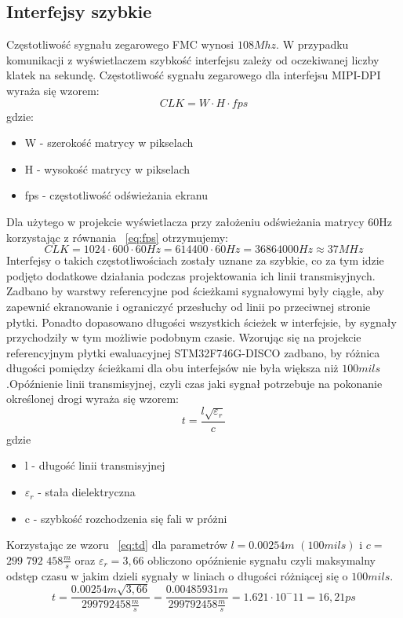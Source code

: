 \documentclass[eng,printmode]{mgr}
\begin{document}
\subsection{Interfejsy szybkie}
Częstotliwość sygnału zegarowego FMC wynosi $108Mhz$. W przypadku komunikacji z wyświetlaczem szybkość interfejsu zależy od oczekiwanej liczby klatek na sekundę. Częstotliwość sygnału zegarowego dla interfejsu MIPI-DPI wyraża się wzorem:
\begin{equation}
CLK = W \cdot H \cdot fps \label{eq:fps}
\end{equation}
gdzie:
\begin{itemize}
  \item W - szerokość matrycy w pikselach
  \item H - wysokość matrycy w pikselach
  \item fps - częstotliwość odświeżania ekranu
\end{itemize}
Dla użytego w projekcie wyświetlacza przy założeniu odświeżania matrycy 60Hz korzystając z równania ~\ref{eq:fps} otrzymujemy:
$$
CLK = 1024 \cdot 600 \cdot 60Hz = 614400 \cdot 60Hz = 36864000 Hz \approx 37MHz
$$
Interfejsy o takich częstotliwościach zostały uznane za szybkie, co za tym idzie podjęto dodatkowe działania podczas projektowania ich linii transmisyjnych. Zadbano by warstwy referencyjne pod ścieżkami sygnałowymi były ciągłe, aby zapewnić ekranowanie i ograniczyć przesłuchy od linii po przeciwnej stronie płytki. Ponadto dopasowano długości wszystkich ścieżek w interfejsie, by sygnały przychodziły w tym możliwie podobnym czasie. Wzorując się na projekcie referencyjnym płytki ewaluacyjnej STM32F746G-DISCO zadbano, by różnica długości pomiędzy ścieżkami dla obu interfejsów nie była większa niż $100 mils$.Opóźnienie linii transmisyjnej, czyli czas jaki sygnał potrzebuje na pokonanie określonej drogi wyraża się wzorem:
\begin{equation}
t = \frac{l \sqrt{\varepsilon_r}}{c} \label{eq:td}
\end{equation}
gdzie
\begin{itemize}
  \item l - długość linii transmisyjnej
  \item \textbf{$\varepsilon_r$} - stała dielektryczna 
  \item c - szybkość rozchodzenia się fali w próżni
\end{itemize}
Korzystając ze wzoru ~\ref{eq:td} dla parametrów $l = 0.00254m$ $(100 mils)$ i $c = $ $299$ $792$ $458\frac{m}{s}$ oraz $\varepsilon_r =3,66$ obliczono opóźnienie sygnału czyli maksymalny odstęp czasu w jakim dzieli sygnały w liniach o długości różniącej się o $100mils$.
$$
t = \frac{0.00254m \sqrt{3,66}}{299 792 458\frac{m}{s}} = \frac{0.00485931m}{299 792 458\frac{m}{s}} = 1.621\cdot10^-11 = 16,21 ps
$$
\end{document}
